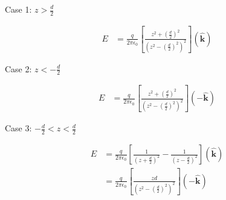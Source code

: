 \documentclass{article}
\begin{document}
Case 1: $z > \frac{d}{2}$

\begin{align*}
E &= \frac{q}{2 \pi \epsilon_0} 
\left[ 
\frac{z^2 + (\frac{d}{2})^2}{(z^2 - (\frac{d}{2})^2)^2}
\right] \mathbf{(\hat{k})}
\end{align*}

Case 2: $z < -\frac{d}{2}$

\begin{align*}
E &= \frac{q}{2 \pi \epsilon_0} 
\left[ 
\frac{z^2 + (\frac{d}{2})^2}{(z^2 - (\frac{d}{2})^2)^2}
\right] (-\mathbf{\hat{k}})
\end{align*}

Case 3: $-\frac{d}{2} < z < \frac{d}{2}$

\begin{align*}
E &= \frac{q}{2 \pi \epsilon_0} 
\left[ 
\frac{1}{(z + \frac{d}{2})^2} - \frac{1}{(z - \frac{d}{2})^2}
\right] (\mathbf{\hat{k}})\\
&= \frac{q}{2 \pi \epsilon_0} 
\left[ 
\frac{zd}{(z^2 - (\frac{d}{2})^2)^2}
\right] (-\mathbf{\hat{k}})
\end{align*}
\end{document}
